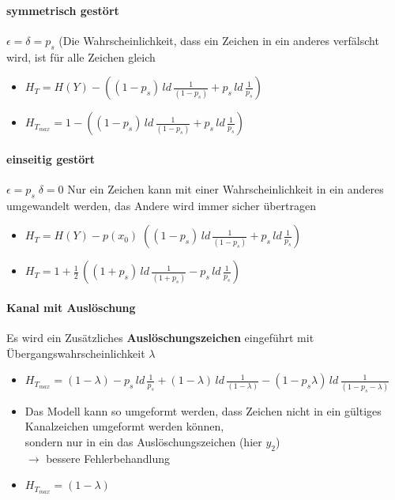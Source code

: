 \documentclass[12pt,a4paper]{article}
\begin{document}
\paragraph{symmetrisch gestört\\}
$\epsilon = \delta = p_s$ (Die Wahrscheinlichkeit, dass ein Zeichen in ein anderes verfälscht wird, ist für alle Zeichen gleich
\begin{itemize}
\item $H_T = H(Y) - ((1-p_s)\, ld \, \frac{1}{(1-p_s)} + p_s \, ld \, \frac{1}{p_s})$
\item $H_{T_{max}} = 1 - ((1-p_s) \, ld \, \frac{1}{(1-p_s)} + p_s \, ld \, \frac{1}{p_s})$
\end{itemize}

\paragraph{einseitig gestört\\}
$\epsilon = p_s\; \delta = 0$  Nur ein Zeichen kann mit einer Wahrscheinlichkeit in ein anderes umgewandelt werden, das Andere wird immer sicher übertragen
\begin{itemize}
\item $H_T = H(Y) - p(x_0) \; ((1-p_s) \, ld \, \frac{1}{(1-p_s)} + p_s \, ld \, \frac{1}{p_s})$
\item $H_T = 1+\frac{1}{2} \, ((1+p_s) \, ld \, \frac{1}{(1+p_s)} - p_s \, ld \, \frac{1}{p_s})$
\end{itemize}
\newpage
\paragraph{Kanal mit Auslöschung\\}
Es wird ein Zusätzliches \textbf{Auslöschungszeichen} eingeführt mit Übergangswahrscheinlichkeit $\lambda$

\begin{itemize}
\item $H_{T_{max}} = (1-\lambda) - p_s \, ld \, \frac{1}{p_s} + (1-\lambda) \, ld \, \frac{1}{(1-\lambda)} - (1-p_s \lambda) \, ld \, \frac{1}{(1-p_s-\lambda)}$
\item Das Modell kann so umgeformt werden, dass Zeichen nicht in ein gültiges Kanalzeichen umgeformt werden können,\\
sondern nur in ein das Auslöschungszeichen (hier $y_2$)\\
$\rightarrow$ bessere Fehlerbehandlung
\item $H_{T_{max}} = (1-\lambda)$
\end{itemize}
\end{document}

